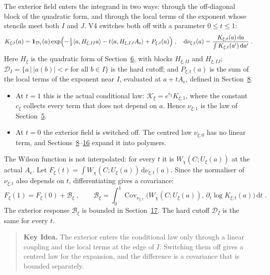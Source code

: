 \documentclass[11pt,a4paper]{article}
\newcommand{\dd}{\mathrm{d}}
\newcommand{\id}{\mathbf 1}
\newcommand{\idea}[1]{\begin{quote}\small\textbf{Key Idea.} #1\end{quote}}
\begin{document}
The exterior field enters the integrand in two ways: through the off-diagonal block of the quadratic form, and through the local terms of the exponent whose stencils meet both $I$ and $J$. V4 switches both off with a parameter $0\leqslant t\leqslant1$:
\begin{equation*}
    K_{\xi;t}(a)=\id_{\mathcal D_I}(a)\exp\Bigl(-\tfrac12\langle a,H_{\xi,II}a\rangle-t\langle a,H_{\xi,IJ}A_{\mathrm e}\rangle+P_{\xi,t}(a)\Bigr)\;,\quad \dd\nu_{\xi;t}(a)=\frac{K_{\xi;t}(a)\,\dd a}{\int K_{\xi;t}(a')\,\dd a'}\;.
\end{equation*}
Here $H_\xi$ is the quadratic form of Section~\hyperref[summary:6]{6}, with blocks $H_{\xi,II}$ and $H_{\xi,IJ}$; $\mathcal D_I=\{a\,|\,|a(b)|<r\text{ for all }b\in I\}$ is the hard cutoff; and $P_{\xi,t}(a)$ is the sum of the local terms of the exponent near $I$, evaluated at $a+tA_{\mathrm e}$, defined in Section~\hyperref[summary:8]{8}.
\begin{itemize}
    \item At $t=1$ this is the actual conditional law: $\mathcal K_\xi=e^{c_\xi}K_{\xi;1}$, where the constant $c_\xi$ collects every term that does not depend on $a$. Hence $\nu_{\xi;1}$ is the law of Section~\hyperref[summary:5]{5}.
    \item At $t=0$ the exterior field is switched off. The centred law $\nu_{\xi;0}$ has no linear term, and Sections~\hyperref[summary:8]{8}--\hyperref[summary:16]{16} expand it into polymers.
\end{itemize}

The Wilson function is not interpolated: for every $t$ it is $W_\chi(C;U_\xi(a))$ at the actual $A_{\mathrm e}$. Let $F_\xi(t)=\int W_\chi(C;U_\xi(a))\,\dd\nu_{\xi;t}(a)$. Since the normaliser of $\nu_{\xi;t}$ also depends on $t$, differentiating gives a covariance:
\begin{equation*}
    F_\xi(1)=F_\xi(0)+\mathcal B_\xi\;,\qquad \mathcal B_\xi=\int_0^1\operatorname{Cov}_{\nu_{\xi;t}}\bigl(W_\chi(C;U_\xi(a)),\,\partial_t\log K_{\xi;t}(a)\bigr)\,\dd t\;.
\end{equation*}
The exterior response $\mathcal B_\xi$ is bounded in Section~\hyperref[summary:17]{17}. The hard cutoff $\mathcal D_I$ is the same for every $t$.

\idea{The exterior enters the conditional law only through a linear coupling and the local terms at the edge of $I$. Switching them off gives a centred law for the expansion, and the difference is a covariance that is bounded separately.}
\end{document}
